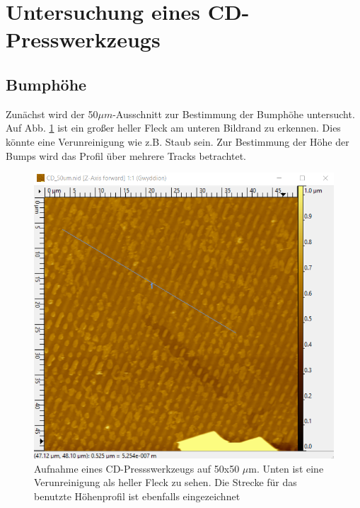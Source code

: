 

\section{Untersuchung eines CD-Presswerkzeugs}
\subsection{Bumphöhe}

Zunächst wird der 50$\mu m$-Ausschnitt zur Bestimmung der Bumphöhe untersucht.
Auf Abb. \ref{bild:CD50Linie} ist ein großer heller Fleck am unteren Bildrand zu erkennen. Dies könnte eine Verunreinigung wie z.B. Staub sein. 
Zur Bestimmung der Höhe der Bumps wird das Profil über mehrere Tracks betrachtet. 

\begin{figure}[h]
    \centering
    \includegraphics[scale = 0.47]{Bilder/CD50Linie.png}
    \caption{Aufnahme eines CD-Pressswerkzeugs auf 50x50 $\mu$m. Unten ist eine Verunreinigung als heller Fleck zu sehen. Die Strecke 
    für das benutzte Höhenprofil ist ebenfalls eingezeichnet}
    \label{bild:CD50Linie}
\end{figure}

